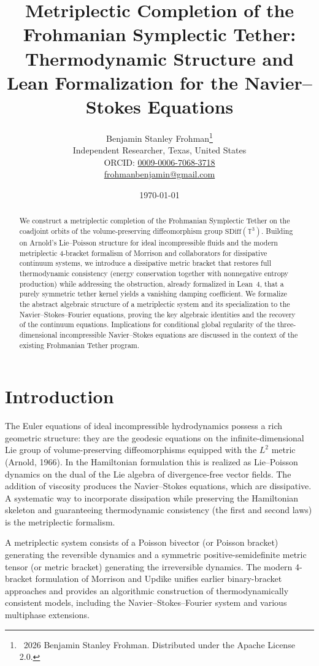 \documentclass[11pt,a4paper]{article}
\title{\textbf{Metriplectic Completion of the Frohmanian Symplectic Tether:\\
Thermodynamic Structure and Lean Formalization for the Navier--Stokes Equations}}
\author{Benjamin Stanley Frohman\thanks{\textcopyright\ 2026 Benjamin Stanley Frohman. Distributed under the Apache License 2.0.}\\
Independent Researcher, Texas, United States\\
ORCID: \href{https://orcid.org/0009-0006-7068-3718}{0009-0006-7068-3718}\\
\href{mailto:frohmanbenjamin@gmail.com}{frohmanbenjamin@gmail.com}}
\date{\today}
\begin{document}
\maketitle

\begin{abstract}
We construct a metriplectic completion of the Frohmanian Symplectic Tether on the coadjoint orbits of the volume-preserving diffeomorphism group \(\mathrm{SDiff}(\mathbb{T}^3)\). Building on Arnold's Lie--Poisson structure for ideal incompressible fluids and the modern metriplectic 4-bracket formalism of Morrison and collaborators for dissipative continuum systems, we introduce a dissipative metric bracket that restores full thermodynamic consistency (energy conservation together with nonnegative entropy production) while addressing the obstruction, already formalized in Lean~4, that a purely symmetric tether kernel yields a vanishing damping coefficient. We formalize the abstract algebraic structure of a metriplectic system and its specialization to the Navier--Stokes--Fourier equations, proving the key algebraic identities and the recovery of the continuum equations. Implications for conditional global regularity of the three-dimensional incompressible Navier--Stokes equations are discussed in the context of the existing Frohmanian Tether program.
\end{abstract}

\tableofcontents

\section{Introduction}
The Euler equations of ideal incompressible hydrodynamics possess a rich geometric structure: they are the geodesic equations on the infinite-dimensional Lie group of volume-preserving diffeomorphisms equipped with the \(L^2\) metric (Arnold, 1966). In the Hamiltonian formulation this is realized as Lie--Poisson dynamics on the dual of the Lie algebra of divergence-free vector fields. The addition of viscosity produces the Navier--Stokes equations, which are dissipative. A systematic way to incorporate dissipation while preserving the Hamiltonian skeleton and guaranteeing thermodynamic consistency (the first and second laws) is the metriplectic formalism.

A metriplectic system consists of a Poisson bivector (or Poisson bracket) generating the reversible dynamics and a symmetric positive-semidefinite metric tensor (or metric bracket) generating the irreversible dynamics. The modern 4-bracket formulation of Morrison and Updike unifies earlier binary-bracket approaches and provides an algorithmic construction of thermodynamically consistent models, including the Navier--Stokes--Fourier system and various multiphase extensions.
\end{document}
